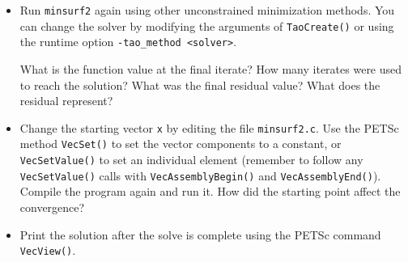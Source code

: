\documentclass[11pt]{article}
\begin{document}
\begin{enumerate}
\begin{itemize}
  \item 
  Run \texttt{minsurf2} again using other unconstrained minimization 
  methods.    You can change the solver by modifying the arguments of 
  \texttt{TaoCreate()} or using the runtime option \texttt{-tao\_method <solver>}.
 
  What is the function value at the final iterate?
  How many iterates were used to reach
  the solution?  What was the final residual value? What does the residual represent?

 \item 
  Change the starting vector \texttt{x} by editing the file \texttt{minsurf2.c}.  
  Use the PETSc method {\tt VecSet()}
  to set the vector components to a constant, or {\tt VecSetValue()} to set 
  an individual element (remember to follow any {\tt VecSetValue()} calls
  with {\tt VecAssemblyBegin()} and {\tt VecAssemblyEnd()}).  Compile the program again and run it.
  How did the starting point affect the convergence?

 \item Print the solution after the solve is complete using the PETSc command {\tt VecView()}.
\end{itemize}

\end{enumerate}
\end{document}
